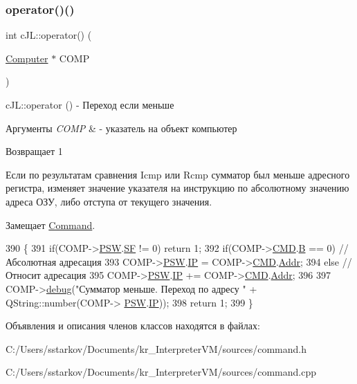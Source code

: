 \subsubsection{\texorpdfstring{operator()()}{operator()()}}
{\footnotesize\ttfamily int c\+J\+L\+::operator() (\begin{DoxyParamCaption}\item[{\hyperlink{class_computer}{Computer} $\ast$}]{C\+O\+MP }\end{DoxyParamCaption})\hspace{0.3cm}{\ttfamily [virtual]}}



c\+J\+L\+::operator () -\/ Переход если меньше 


\begin{DoxyParams}{Аргументы}
{\em C\+O\+MP} & -\/ указатель на объект компьютер \\
\hline
\end{DoxyParams}
\begin{DoxyReturn}{Возвращает}
1
\end{DoxyReturn}
Если по результатам сравнения Icmp или Rcmp сумматор был меньше адресного регистра, изменяет значение указателя на инструкцию по абсолютному значению адреса ОЗУ, либо отступа от текущего значения. 

Замещает \hyperlink{class_command_a79939b66f3de892e91d7710844294716}{Command}.


\begin{DoxyCode}
390 \{
391     \textcolor{keywordflow}{if}(COMP->\hyperlink{class_computer_aada011a29d87bb979835371a5f09805e}{PSW}.\hyperlink{struct_computer_1_1bits_a74cfe87f17ba348db37c74bbd5e56828}{SF} != 0) \textcolor{keywordflow}{return} 1;
392     \textcolor{keywordflow}{if}(COMP->\hyperlink{class_computer_a8423168f7cc356b4dd36977603798caf}{CMD}.\hyperlink{struct_computer_1_1command_a3e0d1e527de9f60594023a362b08a7de}{B} == 0) \textcolor{comment}{//Абсолютная адресация}
393         COMP->\hyperlink{class_computer_aada011a29d87bb979835371a5f09805e}{PSW}.\hyperlink{struct_computer_1_1bits_a7781883b446209714ad687e2a4f77526}{IP} = COMP->\hyperlink{class_computer_a8423168f7cc356b4dd36977603798caf}{CMD}.\hyperlink{struct_computer_1_1command_a0e07591012953413797506f7bc3cb1a7}{Addr};
394     \textcolor{keywordflow}{else} \textcolor{comment}{//Относит адресация}
395         COMP->\hyperlink{class_computer_aada011a29d87bb979835371a5f09805e}{PSW}.\hyperlink{struct_computer_1_1bits_a7781883b446209714ad687e2a4f77526}{IP} += COMP->\hyperlink{class_computer_a8423168f7cc356b4dd36977603798caf}{CMD}.\hyperlink{struct_computer_1_1command_a0e07591012953413797506f7bc3cb1a7}{Addr};
396 
397     COMP->\hyperlink{class_computer_a10ca6c6b200630119201de16d7368e0f}{debug}(\textcolor{stringliteral}{"Сумматор меньше. Переход по адресу "} + QString::number(COMP->
      \hyperlink{class_computer_aada011a29d87bb979835371a5f09805e}{PSW}.\hyperlink{struct_computer_1_1bits_a7781883b446209714ad687e2a4f77526}{IP}));
398     \textcolor{keywordflow}{return} 1;
399 \}
\end{DoxyCode}


Объявления и описания членов классов находятся в файлах\+:\begin{DoxyCompactItemize}
\item 
C\+:/\+Users/sstarkov/\+Documents/kr\+\_\+\+Interpreter\+V\+M/sources/command.\+h\item 
C\+:/\+Users/sstarkov/\+Documents/kr\+\_\+\+Interpreter\+V\+M/sources/command.\+cpp\end{DoxyCompactItemize}
